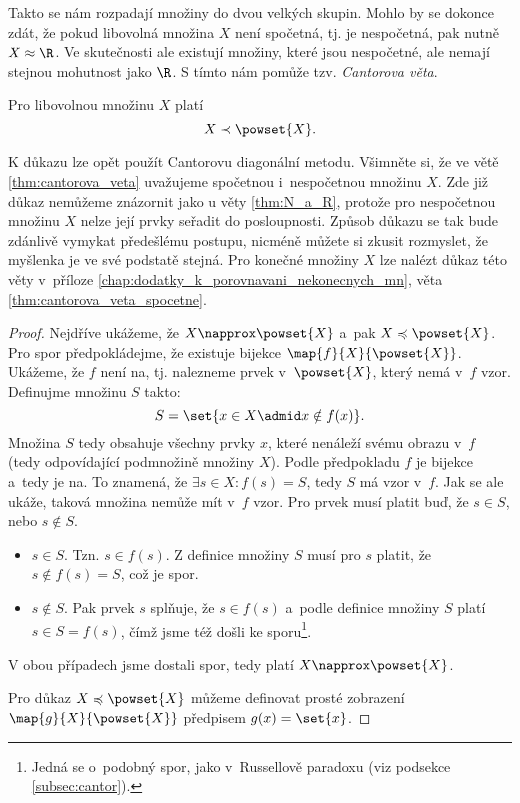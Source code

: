 Takto se nám rozpadají množiny do dvou velkých skupin. Mohlo by se dokonce zdát, že pokud libovolná množina $X$ není spočetná, tj. je nespočetná, pak nutně $X\approx\R$. Ve skutečnosti ale existují množiny, které jsou nespočetné, ale nemají stejnou mohutnost jako $\R$. S tímto nám pomůže tzv. \emph{Cantorova věta}.
\begin{theorem}[Cantorova]\label{thm:cantorova_veta}
    Pro libovolnou množinu $X$ platí
    \begin{equation*}
        X\prec\powset{X}.
    \end{equation*}
\end{theorem}
K důkazu lze opět použít Cantorovu diagonální metodu. Všimněte si, že ve větě \ref{thm:cantorova_veta} uvažujeme spočetnou i~nespočetnou množinu $X$. Zde již důkaz nemůžeme znázornit jako u věty \ref{thm:N_a_R}, protože pro nespočetnou množinu $X$ nelze její prvky seřadit do posloupnosti. Způsob důkazu se tak bude zdánlivě vymykat předešlému postupu, nicméně můžete si zkusit rozmyslet, že myšlenka je ve své podstatě stejná. Pro konečné množiny $X$ lze nalézt důkaz této věty v~příloze \ref{chap:dodatky_k_porovnavani_nekonecnych_mn}, věta \ref{thm:cantorova_veta_spocetne}.
\begin{proof}
    Nejdříve ukážeme, že $X\napprox\powset{X}$ a~pak $X\preccurlyeq\powset{X}$. Pro spor předpokládejme, že existuje bijekce $\map{f}{X}{\powset{X}}$. Ukážeme, že $f$ není na, tj. nalezneme prvek v~$\powset{X}$, který nemá v~$f$ vzor. Definujme množinu $S$ takto:
    \begin{equation*}
        S=\set{x\in X \admid x\notin f(x)}.
    \end{equation*}
    Množina $S$ tedy obsahuje všechny prvky $x$, které nenáleží svému obrazu v~$f$ (tedy odpovídající podmnožině množiny $X$). Podle předpokladu $f$ je bijekce a~tedy je na. To znamená, že $\exists s\in X: f(s)=S$, tedy $S$ má vzor v~$f$. Jak se ale ukáže, taková množina nemůže mít v~$f$ vzor. Pro prvek musí platit buď, že $s\in S$, nebo $s\notin S$.
    \begin{itemize}
        \item $s\in S$. Tzn. $s\in f(s)$. Z definice množiny $S$ musí pro $s$ platit, že $s\notin f(s)=S$, což je spor.
        \item $s\notin S$. Pak prvek $s$ splňuje, že $s\in f(s)$ a~podle definice množiny $S$ platí $s\in S=f(s)$, čímž jsme též došli ke sporu\footnote{Jedná se o~podobný spor, jako v~Russellově paradoxu (viz podsekce \ref{subsec:cantor}).}.
    \end{itemize}
    V obou případech jsme dostali spor, tedy platí $X\napprox\powset{X}$.\par
    Pro důkaz $X\preccurlyeq\powset{X}$ můžeme definovat prosté zobrazení $\map{g}{X}{\powset{X}}$ předpisem $g(x)=\set{x}$.
\end{proof}
